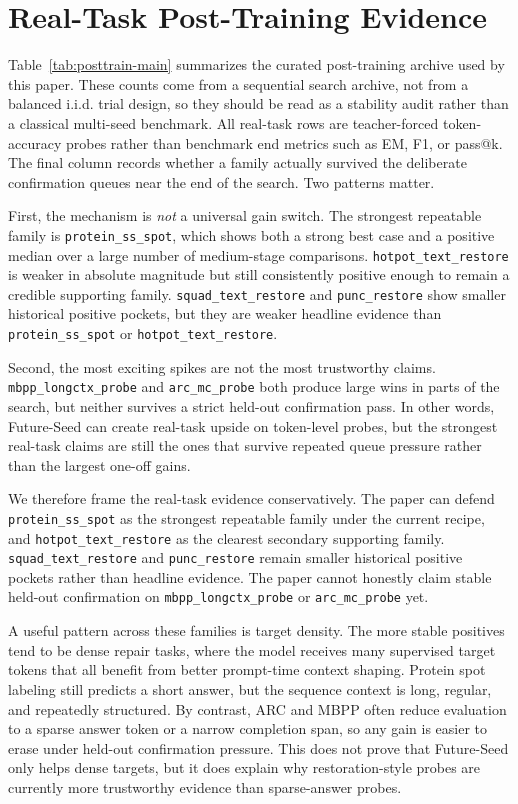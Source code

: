 \documentclass{article}
\begin{document}
\section{Real-Task Post-Training Evidence}


Table~\ref{tab:posttrain-main} summarizes the curated post-training archive used by this paper. These counts come from a sequential search archive, not from a balanced i.i.d. trial design, so they should be read as a stability audit rather than a classical multi-seed benchmark. All real-task rows are teacher-forced token-accuracy probes rather than benchmark end metrics such as EM, F1, or pass@k. The final column records whether a family actually survived the deliberate confirmation queues near the end of the search. Two patterns matter.

First, the mechanism is \emph{not} a universal gain switch. The strongest repeatable family is \texttt{protein\_ss\_spot}, which shows both a strong best case and a positive median over a large number of medium-stage comparisons. \texttt{hotpot\_text\_restore} is weaker in absolute magnitude but still consistently positive enough to remain a credible supporting family. \texttt{squad\_text\_restore} and \texttt{punc\_restore} show smaller historical positive pockets, but they are weaker headline evidence than \texttt{protein\_ss\_spot} or \texttt{hotpot\_text\_restore}.

Second, the most exciting spikes are not the most trustworthy claims. \texttt{mbpp\_longctx\_probe} and \texttt{arc\_mc\_probe} both produce large wins in parts of the search, but neither survives a strict held-out confirmation pass. In other words, Future-Seed can create real-task upside on token-level probes, but the strongest real-task claims are still the ones that survive repeated queue pressure rather than the largest one-off gains.

We therefore frame the real-task evidence conservatively. The paper can defend \texttt{protein\_ss\_spot} as the strongest repeatable family under the current recipe, and \texttt{hotpot\_text\_restore} as the clearest secondary supporting family. \texttt{squad\_text\_restore} and \texttt{punc\_restore} remain smaller historical positive pockets rather than headline evidence. The paper cannot honestly claim stable held-out confirmation on \texttt{mbpp\_longctx\_probe} or \texttt{arc\_mc\_probe} yet.


A useful pattern across these families is target density. The more stable positives tend to be dense repair tasks, where the model receives many supervised target tokens that all benefit from better prompt-time context shaping. Protein spot labeling still predicts a short answer, but the sequence context is long, regular, and repeatedly structured. By contrast, ARC and MBPP often reduce evaluation to a sparse answer token or a narrow completion span, so any gain is easier to erase under held-out confirmation pressure. This does not prove that Future-Seed only helps dense targets, but it does explain why restoration-style probes are currently more trustworthy evidence than sparse-answer probes.
\end{document}
